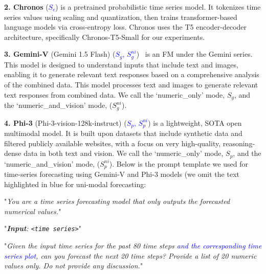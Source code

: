 
\noindent \textbf{2. Chronos} (\textcolor{blue}{$S_c$}) \cite{ansari2024chronos} is a pretrained probabilistic time series model. It tokenizes time series values using scaling and quantization, then trains transformer-based language models via cross-entropy loss. Chronos uses the T5 encoder-decoder architecture, specifically Chronos-T5-Small for our experiments.

\noindent \textbf{3. Gemini-V} (Gemini 1.5 Flash) (\textcolor{blue}{$S_g$, $S_g^{ni}$})~\cite{team2023gemini} is an FM under the Gemini series. 
This model is designed to understand inputs that include text and images, enabling it to generate relevant text responses based on a comprehensive analysis of the combined data. 
This model processes text and images to generate relevant text responses from combined data. We call the `numeric\_only' mode, $S_g$, and the `numeric\_and\_vision' mode, ($S_g^{ni}$).


\noindent \textbf{4. Phi-3} (Phi-3-vision-128k-instruct) (\textcolor{blue}{$S_p$, $S_p^{ni}$}) \cite{abdin2024phi} is a lightweight, SOTA open multimodal model. It is built upon datasets that include synthetic data and filtered publicly available websites, with a focus on very high-quality, reasoning-dense data in both text and vision. 
We call the `numeric\_only' mode, $S_p$, and the `numeric\_and\_vision' mode, ($S_p^{ni}$). Below is the prompt template we used for time-series forecasting using Gemini-V and Phi-3 models (we omit the text highlighted in blue for uni-modal forecasting:

\begin{tcolorbox}[colframe=black, colback=white, boxrule=0.5pt, width=\columnwidth, arc=0mm, boxsep=0mm, left=1mm, right=1mm, top=0.25mm, bottom=0.25mm]
\smaller
\noindent"\textit{You are a time series forecasting model that only outputs the forecasted numerical values.}" 

\noindent"\textit{\textbf{Input}: \texttt{<time series>}}" 

\noindent"\textit{Given the input time series for the past 80 time steps \textcolor{blue}{and the corresponding time series plot}, can you forecast the next 20 time steps? Provide a list of 20 numeric values only. Do not provide any discussion.}"  
\end{tcolorbox}
 

